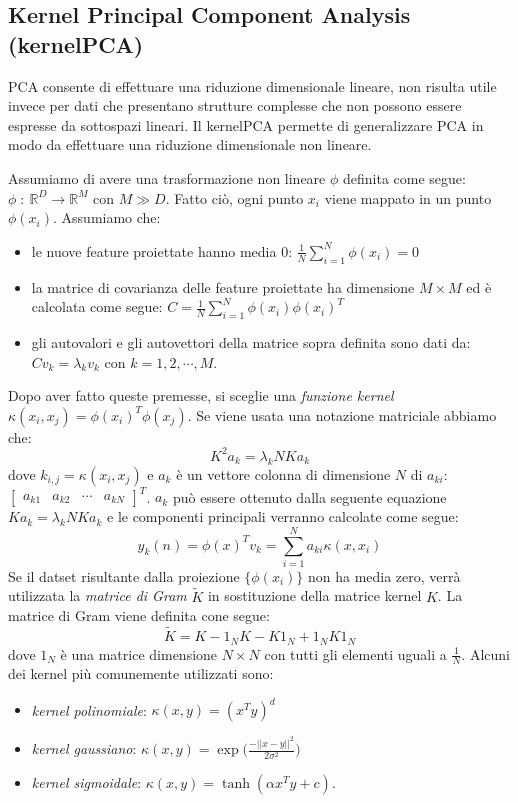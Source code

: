 \documentclass[11pt,a4paper,twocolumn]{article}
\begin{document}
\subsection{Kernel Principal Component Analysis (kernelPCA)}
PCA consente di effettuare una riduzione dimensionale lineare, non risulta utile invece  per dati che presentano strutture complesse che non possono essere espresse da sottospazi lineari. Il kernelPCA permette di generalizzare PCA in modo da effettuare una riduzione dimensionale non lineare. \par
Assumiamo di avere una trasformazione non lineare $\phi$ definita come segue: $\phi \;: \: \mathbb{R}^D \rightarrow  \mathbb{R}^M $ con $ M \gg D $.  Fatto ciò, ogni punto $ x_i $ viene mappato in un punto $ \phi(x_i) $. Assumiamo che:
\begin{itemize}
\item le nuove feature proiettate hanno media 0: $ \frac{1}{N}\sum_{i=1}^N{\phi(x_i)}=0$
\item la matrice di covarianza delle feature proiettate ha dimensione $ M \times M $ ed è calcolata come segue: $ C=\frac{1}{N}\sum_{i=1}^N{\phi(x_i)\phi(x_i)^T} $
\item gli autovalori e gli autovettori della matrice sopra definita sono dati da: $ Cv_k=\lambda_k v_k $ con $k=1,2,\cdots,M$.
\end{itemize}
Dopo aver fatto queste premesse, si sceglie una \emph{funzione kernel} $ \kappa(x_i,x_j)=\phi(x_i)^T\phi(x_j) $. Se viene usata una notazione matriciale abbiamo che:
\begin{equation}
\nonumber
K^2a_k=\lambda_kNKa_k
\end{equation}
dove $ k_{i,j}=\kappa(x_i,x_j) $ e $a_k$ è un vettore colonna di dimensione $N$ di $a_{ki}$: $\begin{bmatrix}
a_{k1}& a_{k2} & \cdots & a_{kN}
\end{bmatrix} ^T$. 
$a_k$ può essere ottenuto dalla seguente equazione $ Ka_k=\lambda_kNKa_k$ e le componenti principali verranno calcolate come segue:
\begin{equation}
\nonumber
y_k(n)=\phi(x)^Tv_k=\sum_{i=1}^N{a_{ki}}\kappa(x,x_i)
\end{equation}
Se il datset risultante dalla proiezione $\{\phi(x_i)\}$ non ha media zero, verrà utilizzata la \emph{matrice di Gram} $\tilde{K}$  in sostituzione della matrice kernel $K$. La matrice di Gram viene definita cone segue:
\begin{equation}
\nonumber
\tilde{K}=K-1_NK-K1_N+1_NK1_N
\end{equation}
dove $1_N$ è una matrice dimensione $N \times N$ con tutti gli elementi uguali a $ \frac{1}{N}$.
Alcuni dei kernel più comunemente utilizzati sono:
\begin{itemize}
\item \emph{kernel polinomiale}: $ \kappa(x,y)=(x^Ty)^d $
\item \emph{kernel gaussiano}: $ \kappa(x,y)=\exp{\biggl(\frac{- \lvert \lvert {x-y} \lvert \lvert ^2}{2 \sigma^2}\biggr)} $
\item \emph{kernel sigmoidale}: $\kappa(x,y)=\tanh{(\alpha x^Ty+c)}$.
\end{itemize}
\end{document}
